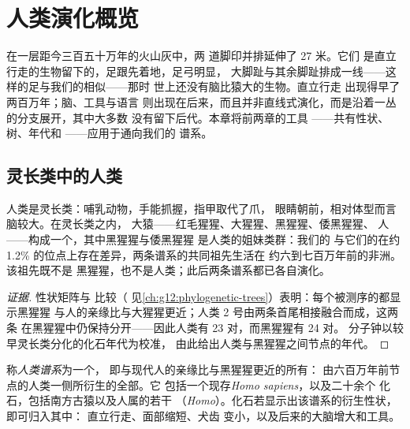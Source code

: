\chapter{人类演化概览}\label{ch:g12:human-evolution}

在一层距今三百五十万年的火山灰中，两
道脚印并排延伸了 27 米。它们
是直立行走的生物留下的，足跟先着地，足弓明显，
大脚趾与其余脚趾排成一线——这样的足与我们的相似——那时
世上还没有脑比猿大的生物。直立行走
出现得早了两百万年；脑、工具与语言
则出现在后来，而且并非直线式演化，而是沿着一丛的分支展开，其中大多数
没有留下后代。本章将前两章的工具
——共有性状、树、年代和 ——应用于通向我们的
谱系。

\section{灵长类中的人类}

\begin{proposition}[人类在树中的位置]\label{prop:g12:human-evolution:place}
人类是灵长类：哺乳动物，手能抓握，指甲取代了爪，
眼睛朝前，相对体型而言脑较大。在灵长类之内，
大猿——红毛猩猩、大猩猩、黑猩猩、倭黑猩猩、
人——构成一个，其中黑猩猩与倭黑猩猩
是人类的姐妹类群：我们的  与它们的在约
1.2\% 的位点上存在差异，两条谱系的共同祖先生活在
约六到七百万年前的非洲。该祖先既不是
黑猩猩，也不是人类；此后两条谱系都已各自演化。
\end{proposition}
\begin{proof}[证据]
性状矩阵与  比较（
见\cref{ch:g12:phylogenetic-trees}）表明：每个被测序的都显示黑猩猩
与人的亲缘比与大猩猩更近；人类
2 号由两条首尾相接融合而成，这两条
在黑猩猩中仍保持分开——因此人类有 23 对，而黑猩猩有 24 对。
分子钟以较早灵长类分化的化石年代为校准，
由此给出人类与黑猩猩之间节点的年代。
\end{proof}

\begin{definition}[人类谱系]\label{def:g12:human-evolution:lineage}
称\emph{人类谱系}为一个，
即与现代人的亲缘比与黑猩猩更近的所有：
由六百万年前节点的人类一侧所衍生的全部。它
包括一个现存\emph{Homo sapiens}，以及二十余个
化石，包括南方古猿以及人属的若干
（\emph{Homo}）。化石若显示出该谱系的衍生性状，即可归入其中：
直立行走、面部缩短、犬齿
变小，以及后来的大脑增大和工具。
\end{definition}

